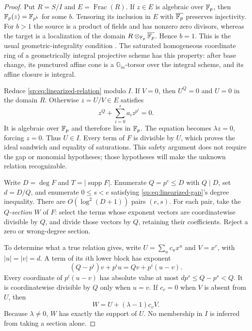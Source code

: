 \begin{proof}
Put $R=S/I$ and $E=\operatorname{Frac}(R)$. If $z\in E$ is
algebraic over $\mathbb F_p$, then $\mathbb F_p(z)=\mathbb F_{p^b}$ for some $b$.
Tensoring its inclusion in $E$ with $\overline{\mathbb F_p}$ preserves
injectivity. For $b>1$ the source is a product of fields and has
nonzero zero divisors, whereas the target is a localization of the
domain $R\otimes_{\mathbb F_p}\overline{\mathbb F_p}$. Hence $b=1$.
This is the usual geometric-integrality condition
\citep[Definition~10.49.1 and Lemma~10.49.3]{sp-stacks-integral}.
The saturated homogeneous coordinate ring of a geometrically
integral projective scheme has this property: after base change,
its punctured affine cone is a $\mathbb G_m$-torsor over the
integral scheme, and its affine closure is integral.

Reduce \eqref{sp:eq:linearized-relation} modulo $I$.
If $V=0$, then $U^Q=0$ and $U=0$ in the domain $R$.
Otherwise $z=U/V\in E$ satisfies
\[
 z^Q+\sum_{i=0}^{s}a_i z^{p^i}=0.
\]
It is algebraic over $\mathbb F_p$ and therefore lies in $\mathbb F_p$.
The equation becomes $\lambda z=0$, forcing $z=0$.
Thus $U\in I$. Every term of $F$ is divisible by $U$,
which proves the ideal sandwich and equality of saturations.
This safety argument does not require the gap or monomial hypotheses;
those hypotheses will make the unknown relation recognizable.

Write $D=\deg F$ and $T=|\operatorname{supp}F|$.
Enumerate $Q=p^e\le D$ with $Q\mid D$, set $d=D/Q$, and
enumerate $0\le s<e$ satisfying \eqref{sp:eq:linearized-gap}'s
degree inequality. There are $O(\log^2(D+1))$ pairs $(e,s)$.
For each pair, take the \emph{$Q$-section} $W$ of $F$: select
the terms whose exponent vectors are coordinatewise divisible by
$Q$, and divide those vectors by $Q$, retaining their coefficients.
Reject a zero or wrong-degree section.

To determine what a true relation gives, write
$U=\sum_u c_u x^u$ and $V=x^v$, with $|u|=|v|=d$.
A term of its $i$th lower block has exponent
\[
 (Q-p^i)v+p^iu=Qv+p^i(u-v).
\]
Every coordinate of $p^i(u-v)$ has absolute value at most
$dp^s\le Q-p^s<Q$. It is coordinatewise divisible by $Q$
only when $u=v$. If $c_v=0$ when $V$ is absent from $U$, then
\begin{equation}
 W=U+(\lambda-1)c_vV.
 \label{sp:eq:leading-section}
\end{equation}
Because $\lambda\ne0$, $W$ has exactly the support of $U$.
No membership in $I$ is inferred from taking a section alone.


\end{proof}
